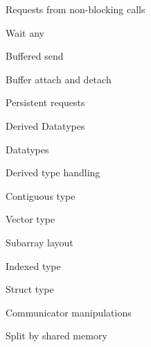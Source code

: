 \documentclass[11pt,headernav]{beamer}
\begin{document}
\begin{frame}[containsverbatim]{Requests from non-blocking calls}
  
\end{frame}
\begin{frame}[containsverbatim]{Wait any}
  
\end{frame}

\begin{frame}[containsverbatim]{Buffered send}
  
\end{frame}
\begin{frame}[containsverbatim]{Buffer attach and detach}
  
\end{frame}
\begin{frame}[containsverbatim]{Persistent requests}
  
\end{frame}

 {Derived Datatypes}

\begin{frame}[containsverbatim]{Datatypes}
  
\end{frame}
\begin{frame}[containsverbatim]{Derived type handling}
  
\end{frame}
\begin{frame}[containsverbatim]{Contiguous type}
  
\end{frame}
\begin{frame}[containsverbatim]{Vector type}
  
\end{frame}
\begin{frame}[containsverbatim]{Subarray layout}
  
\end{frame}
\begin{frame}[containsverbatim]{Indexed type}
  
\end{frame}
\begin{frame}[containsverbatim]{Struct type}
  
\end{frame}

 {Communicator manipulations}

\begin{frame}[containsverbatim]{Split by shared memory}
  
\end{frame}
\end{document}
